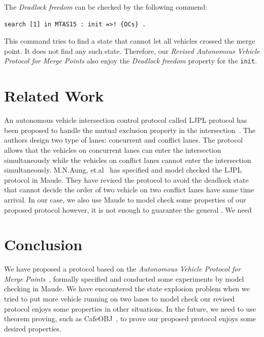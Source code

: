 \documentclass[10pt, conference, compsocconf]{IEEEtran}
\begin{document}
The \textit{Deadlock freedom} can be checked by the following commend:

\begin{footnotesize}
\begin{verbatim}
search [1] in MTAS15 : init =>! {OCs} .
\end{verbatim}
\end{footnotesize}

This command tries to find a state that cannot let all vehicles crossed the merge point. 
It does not find any such state.
Therefore, our \textit{Revised Autonomous Vehicle Protocol for Merge Points} also enjoy the \textit{Deadlock freedom} property for the \verb!init!.


 
 
\section{Related Work}
 \label{sect_Relate}
 
An autonomous vehicle intersection control protocol called LJPL protocol has been proposed to handle the mutual exclusion property in the intersection~\cite{LimJongBeom2018Aedm}.
The authors design two type of lanes: concurrent and conflict lanes. 
The protocol allows that the vehicles on concurrent lanes can enter the intersection simultaneously while the vehicles on conflict lanes cannot enter the intersection simultaneously.
M.N.Aung, et.al~\cite{DBLP:conf/seke/AungP019} has specified and model checked the LJPL protocol in Maude.
They have revised the protocol to avoid the deadlock state that cannot decide the order of two vehicle on two conflict lanes have same time arrival.
In our case, we also use Maude to model check some properties of our proposed protocol however, it is not enough to guarantee the general . 
We need 
 








\section{Conclusion}
\label{concl_sect}

We have proposed a protocol based on the \textit{Autonomous Vehicle Protocol for Merge Points}~\cite{10.1145/3055004.3055028}, formally specified and conducted some experiments by model checking in Maude.
We have encountered the state explosion problem when we tried to put more vehicle running on two lanes to model check our revised protocol enjoys some properties in other situations.
In the future, we need to use theorem proving, such as CafeOBJ~\cite{}, to prove our proposed protocol enjoys some desired properties.
\end{document}

